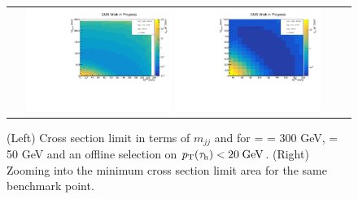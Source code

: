 \begin{figure}[tbh!]
	\centering
	\begin{tabular}{cc}
		\includegraphics[width=0.45\textwidth]{analysis/pics/JetInvMass_vs_MET_xsec_chi300_lsp050_taupt20.pdf}
		\includegraphics[width=0.45\textwidth]{analysis/pics/JetInvMass_vs_MET_xsec_chi300_lsp050_taupt20_zoom.pdf} 		
	\end{tabular}
	\caption{(Left) Cross section limit in terms of $m_{jj}$ and \met for \charginopm = \neutralinotwo = 300 GeV, \neutralinoone = 50 GeV and an offline selection on $p_{\text{T}}(\tau_{\text{h}}) <  20\;\text{Ge}\kern-0.06667em\text{V}$. (Right) Zooming into the minimum cross section limit area for the same benchmark point.}
	\label{fig::JetInvMass_vs_MET_xsec_chi300_lsp050_taupt20}
\end{figure}

